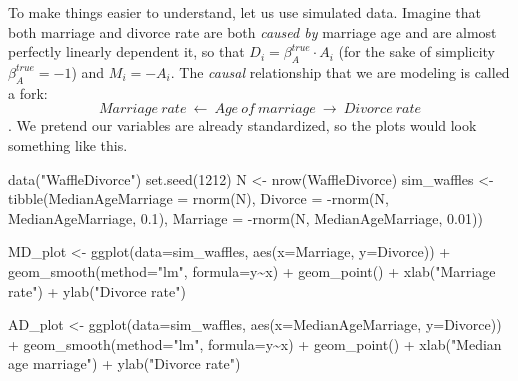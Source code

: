 \documentclass[
]{book}
\newenvironment{Shaded}{\begin{snugshade}}{\end{snugshade}}
\newcommand{\AttributeTok}[1]{\textcolor[rgb]{0.77,0.63,0.00}{#1}}
\newcommand{\DecValTok}[1]{\textcolor[rgb]{0.00,0.00,0.81}{#1}}
\newcommand{\FloatTok}[1]{\textcolor[rgb]{0.00,0.00,0.81}{#1}}
\newcommand{\FunctionTok}[1]{\textcolor[rgb]{0.00,0.00,0.00}{#1}}
\newcommand{\NormalTok}[1]{#1}
\newcommand{\OtherTok}[1]{\textcolor[rgb]{0.56,0.35,0.01}{#1}}
\newcommand{\SpecialCharTok}[1]{\textcolor[rgb]{0.00,0.00,0.00}{#1}}
\newcommand{\StringTok}[1]{\textcolor[rgb]{0.31,0.60,0.02}{#1}}
\begin{document}
To make things easier to understand, let us use simulated data. Imagine that both marriage and divorce rate are both \emph{caused by} marriage age and are almost perfectly linearly dependent it, so that \(D_i = \beta_A^{true} \cdot A_i\) (for the sake of simplicity \(\beta_A^{true} = -1\)) and \(M_i = -A_i\). The \emph{causal} relationship that we are modeling is called a fork:
\[Marriage~rate~\leftarrow~Age~of~marriage~\rightarrow~Divorce~rate\].
We pretend our variables are already standardized, so the plots would look something like this.

\begin{Shaded}
\begin{Highlighting}[]
\FunctionTok{data}\NormalTok{(}\StringTok{"WaffleDivorce"}\NormalTok{)}
\FunctionTok{set.seed}\NormalTok{(}\DecValTok{1212}\NormalTok{)}
\NormalTok{N }\OtherTok{\textless{}{-}} \FunctionTok{nrow}\NormalTok{(WaffleDivorce)}
\NormalTok{sim\_waffles }\OtherTok{\textless{}{-}} \FunctionTok{tibble}\NormalTok{(}\AttributeTok{MedianAgeMarriage =} \FunctionTok{rnorm}\NormalTok{(N),}
                      \AttributeTok{Divorce =} \SpecialCharTok{{-}}\FunctionTok{rnorm}\NormalTok{(N, MedianAgeMarriage, }\FloatTok{0.1}\NormalTok{),}
                      \AttributeTok{Marriage =} \SpecialCharTok{{-}}\FunctionTok{rnorm}\NormalTok{(N, MedianAgeMarriage, }\FloatTok{0.01}\NormalTok{))}

\NormalTok{MD\_plot }\OtherTok{\textless{}{-}} 
  \FunctionTok{ggplot}\NormalTok{(}\AttributeTok{data=}\NormalTok{sim\_waffles, }\FunctionTok{aes}\NormalTok{(}\AttributeTok{x=}\NormalTok{Marriage, }\AttributeTok{y=}\NormalTok{Divorce)) }\SpecialCharTok{+} 
  \FunctionTok{geom\_smooth}\NormalTok{(}\AttributeTok{method=}\StringTok{"lm"}\NormalTok{, }\AttributeTok{formula=}\NormalTok{y}\SpecialCharTok{\textasciitilde{}}\NormalTok{x) }\SpecialCharTok{+} 
  \FunctionTok{geom\_point}\NormalTok{() }\SpecialCharTok{+} 
  \FunctionTok{xlab}\NormalTok{(}\StringTok{"Marriage rate"}\NormalTok{) }\SpecialCharTok{+} 
  \FunctionTok{ylab}\NormalTok{(}\StringTok{"Divorce rate"}\NormalTok{)}

\NormalTok{AD\_plot }\OtherTok{\textless{}{-}} 
  \FunctionTok{ggplot}\NormalTok{(}\AttributeTok{data=}\NormalTok{sim\_waffles, }\FunctionTok{aes}\NormalTok{(}\AttributeTok{x=}\NormalTok{MedianAgeMarriage, }\AttributeTok{y=}\NormalTok{Divorce)) }\SpecialCharTok{+} 
  \FunctionTok{geom\_smooth}\NormalTok{(}\AttributeTok{method=}\StringTok{"lm"}\NormalTok{, }\AttributeTok{formula=}\NormalTok{y}\SpecialCharTok{\textasciitilde{}}\NormalTok{x) }\SpecialCharTok{+} 
  \FunctionTok{geom\_point}\NormalTok{() }\SpecialCharTok{+} 
  \FunctionTok{xlab}\NormalTok{(}\StringTok{"Median age marriage"}\NormalTok{) }\SpecialCharTok{+} 
  \FunctionTok{ylab}\NormalTok{(}\StringTok{"Divorce rate"}\NormalTok{)}


\end{Highlighting}
\end{Shaded}
\end{document}

